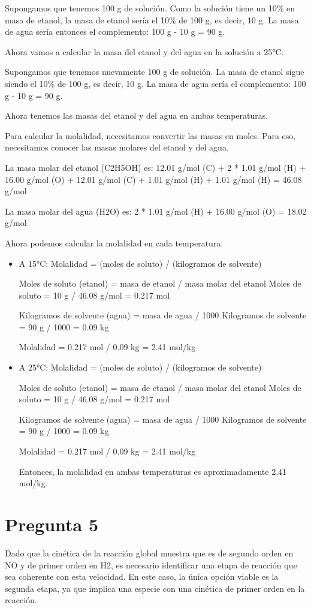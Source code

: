 \documentclass[11pt]{scrartcl}
\begin{document}
Supongamos que tenemos 100 g de solución. Como la solución tiene un 10\% en masa de etanol, la masa de etanol sería el 10\% de 100 g, es decir, 10 g. La masa de agua sería entonces el complemento: 100 g - 10 g = 90 g.

Ahora vamos a calcular la masa del etanol y del agua en la solución a 25°C.

Supongamos que tenemos nuevamente 100 g de solución. La masa de etanol sigue siendo el 10\% de 100 g, es decir, 10 g. La masa de agua sería el complemento: 100 g - 10 g = 90 g.

Ahora tenemos las masas del etanol y del agua en ambas temperaturas.

Para calcular la molalidad, necesitamos convertir las masas en moles. Para eso, necesitamos conocer las masas molares del etanol y del agua.

La masa molar del etanol (C2H5OH) es:
12.01 g/mol (C) + 2 * 1.01 g/mol (H) + 16.00 g/mol (O) + 12.01 g/mol (C) + 1.01 g/mol (H) + 1.01 g/mol (H) = 46.08 g/mol

La masa molar del agua (H2O) es:
2 * 1.01 g/mol (H) + 16.00 g/mol (O) = 18.02 g/mol

Ahora podemos calcular la molalidad en cada temperatura.
\begin{itemize}
	\item A 15°C:
Molalidad = (moles de soluto) / (kilogramos de solvente)

Moles de soluto (etanol) = masa de etanol / masa molar del etanol
Moles de soluto = 10 g / 46.08 g/mol = 0.217 mol

Kilogramos de solvente (agua) = masa de agua / 1000
Kilogramos de solvente = 90 g / 1000 = 0.09 kg

Molalidad = 0.217 mol / 0.09 kg = 2.41 mol/kg

\item A 25°C:
Molalidad = (moles de soluto) / (kilogramos de solvente)

Moles de soluto (etanol) = masa de etanol / masa molar del etanol
Moles de soluto = 10 g / 46.08 g/mol = 0.217 mol

Kilogramos de solvente (agua) = masa de agua / 1000
Kilogramos de solvente = 90 g / 1000 = 0.09 kg

Molalidad = 0.217 mol / 0.09 kg = 2.41 mol/kg

Entonces, la molalidad en ambas temperaturas es aproximadamente 2.41 mol/kg.
\end{itemize}
\section{Pregunta 5}
Dado que la cinética de la reacción global muestra que es de segundo orden en NO y de primer orden en H2, es necesario identificar una etapa de reacción que sea coherente con esta velocidad. En este caso, la única opción viable es la segunda etapa, ya que implica una especie con una cinética de primer orden en la reacción.
  
\end{document}
